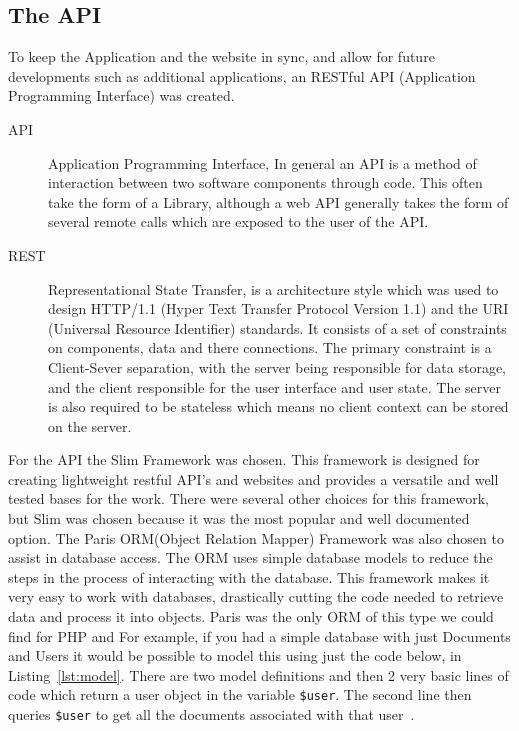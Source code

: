 \documentclass[11pt,a4paper]{article}
\begin{document}
\subsection{The API}
\label{sec:techAPI}
To keep the Application and the website in sync, and allow for future developments such as additional applications, an RESTful API (Application Programming Interface) was created.

\begin{description}
\item[API] Application Programming Interface, In general an API is a method of interaction between two software components through code. This often take the form of a Library, although a web API generally takes the form of several remote calls which are exposed to the user of the API. 

\item[REST] Representational State Transfer, is a architecture style which was used to design HTTP/1.1 (Hyper Text Transfer Protocol Version 1.1) and the URI (Universal Resource Identifier) standards. It consists of a set of constraints on components, data and there connections. The primary constraint is a Client-Sever separation, with the server being responsible for data storage, and the client responsible for the user interface and user state. The server is also required to be stateless which means no client context can be stored on the server.
\end{description}

For the API the Slim Framework\cite{slim} was chosen. This framework is designed for creating lightweight restful API's and websites and provides a versatile and well tested bases for the work. There were several other choices for this framework, but Slim was chosen because it was the most popular and well documented option. The Paris ORM(Object Relation Mapper) Framework\cite{paris} was also chosen to assist in database access. The ORM uses simple database models to reduce the steps in the process of interacting with the database. This framework makes it very easy to work with databases, drastically cutting the code needed to retrieve data and process it into objects. Paris was the only ORM of this type we could find for PHP and  For example, if you had a simple database with just Documents and Users it would be possible to model this using just the code below, in Listing~\ref{lst:model}. There are two model definitions and then 2 very basic lines of code which return a user object in the variable \lstinline{$user}. The second line then queries \lstinline{$user} to get all the documents associated with that user~\cite{TomMilestone2}. 
\end{document}
